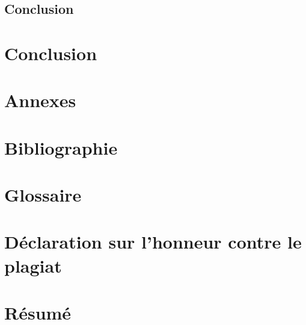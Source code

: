\documentclass[11pt]{article}
\begin{document}
\subsection{Conclusion}
\newpage

\section*{Conclusion}
\newpage

\section*{Annexes}

\section*{Bibliographie}
\newpage

\section*{Glossaire}

\section*{Déclaration sur l'honneur contre le plagiat}

\newpage

\newpage
\section*{Résumé}
\end{document}
